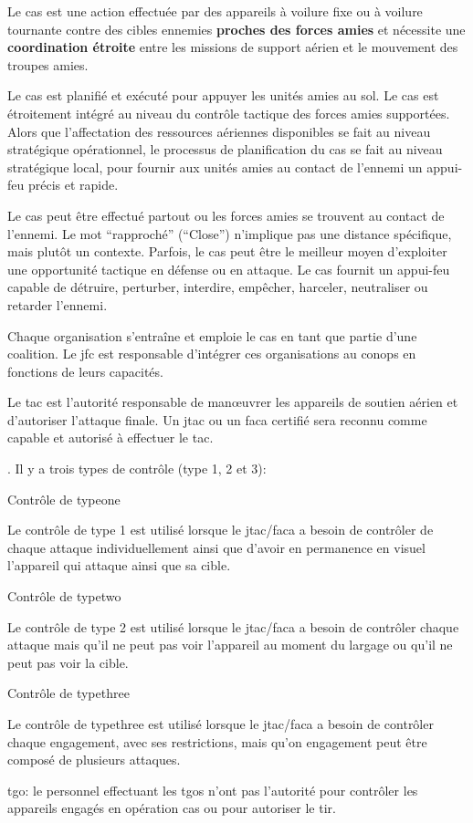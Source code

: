\begin{e1}
	\item
	Le \gls{cas} est une action effectuée par des appareils à voilure fixe ou à voilure tournante contre des cibles ennemies \textbf{proches des forces amies} et nécessite une \textbf{coordination étroite} entre les missions de support aérien et le mouvement des troupes amies.
	\item
	Le \gls{cas} est planifié et exécuté pour appuyer les unités amies au sol. Le \gls{cas} est étroitement intégré au niveau du contrôle tactique des forces amies supportées. Alors que l'affectation des ressources aériennes disponibles se fait au niveau stratégique opérationnel, le processus de planification du \gls{cas} se fait au niveau stratégique local, pour fournir aux unités amies au contact de l'ennemi un appui-feu précis et rapide.
	\item
	Le \gls{cas} peut être effectué partout ou les forces amies se trouvent au contact de l'ennemi. Le mot ``rapproché'' (``Close'') n'implique pas une distance spécifique, mais plutôt un contexte. Parfois, le \gls{cas} peut être le meilleur moyen d'exploiter une opportunité tactique en défense ou en attaque. Le \gls{cas} fournit un appui-feu capable de détruire, perturber, interdire, empêcher, harceler, neutraliser ou retarder l'ennemi.
	\item
	Chaque organisation s'entraîne et emploie le \gls{cas} en tant que partie d'une coalition. Le \gls{jfc} est responsable d'intégrer ces organisations au \gls{conops} en fonctions de leurs capacités.
	\item
	Le \gls{tac} est l'autorité responsable de manœuvrer les appareils de soutien aérien et d'autoriser l'attaque finale. Un \gls{jtac} ou un \gls{faca} certifié sera reconnu comme capable et autorisé à effectuer le \gls{tac}.
	\item
	.
	Il y a trois types de contrôle (type 1, 2 et 3):
	\begin{e2}
		\item
		Contrôle de \gls{typeone}

		Le contrôle de type 1 est utilisé lorsque le \gls{jtac}/\gls{faca} a besoin de contrôler de chaque attaque individuellement ainsi que d'avoir en permanence en visuel l'appareil qui attaque ainsi que sa cible.
		\item
		Contrôle de \gls{typetwo}

		Le contrôle de type 2 est utilisé lorsque le \gls{jtac}/\gls{faca} a besoin de contrôler chaque attaque mais qu'il ne peut pas voir l'appareil au moment du largage ou qu'il ne peut pas voir la cible.
		\item
		Contrôle de \gls{typethree}

		Le contrôle de \gls{typethree} est utilisé lorsque le \gls{jtac}/\gls{faca} a besoin de contrôler chaque engagement, avec ses restrictions, mais qu'on engagement peut être composé de plusieurs attaques.
	\end{e2}
	\item \gls{tgo}: le personnel effectuant les \glspl{tgo} n'ont pas l'autorité pour contrôler les appareils engagés en opération \gls{cas} ou pour autoriser le tir.
\end{e1}
	
